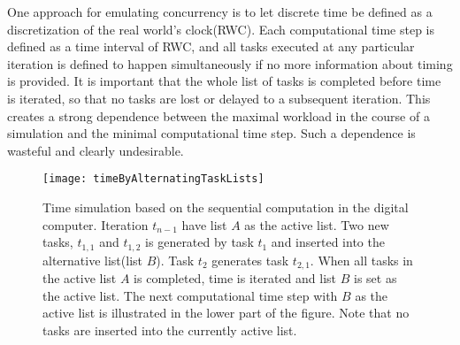 		One approach for emulating concurrency is to let discrete time be defined as a discretization of the real world's clock(RWC).
		Each computational time step is defined as a time interval of RWC, and all tasks executed at any particular iteration is defined to happen simultaneously if no more information about timing is provided.
		It is important that the whole list of tasks is completed before time is iterated, so that no tasks are lost or delayed to a subsequent iteration.
		This creates a strong dependence between the maximal workload in the course of a simulation and the minimal computational time step.
		Such a dependence is wasteful and clearly undesirable.

\begin{figure}[hbt!p]
	\centering
	\texttt{[image: timeByAlternatingTaskLists]}
	\caption[Time simulation by alternating task lists]{
			Time simulation based on the sequential computation in the digital computer.
			Iteration $t_{n-1}$ have list $A$ as the active list. Two new tasks, $t_{1,1}$ and $t_{1,2}$ is generated by task $t_1$ and inserted into the alternative list(list $B$). Task $t_2$ generates task $t_{2,1}$.
			When all tasks in the active list $A$ is completed, time is iterated and list $B$ is set as the active list. 
			The next computational time step with $B$ as the active list is illustrated in the lower part of the figure.
			Note that no tasks are inserted into the currently active list.
			}
	\label{figTimePropagationByAlternatingTaskLists}
\end{figure}

